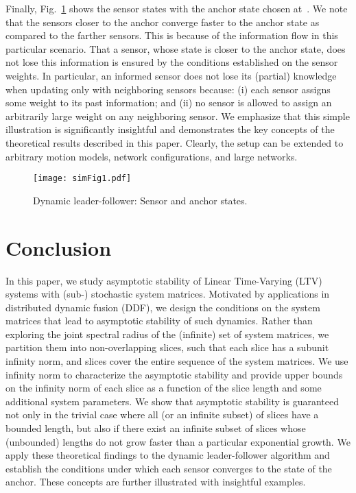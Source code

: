 \documentclass[draftclsnofoot, onecolumn, 12pt]{IEEEtran}
\begin{document}
Finally, Fig.~\ref{f4} shows the sensor states with the anchor state chosen at~. We note that the sensors closer to the anchor converge faster to the anchor state as compared to the farther sensors. This is because of the information flow in this particular scenario. That a sensor, whose state is closer to the anchor state, does not lose this information is ensured by the conditions established on the sensor weights. In particular, an informed sensor does not lose its (partial) knowledge when updating only with neighboring sensors because: (i) each sensor assigns some weight to its past information; and (ii) no sensor is allowed to assign an arbitrarily large weight on any neighboring sensor. We emphasize that this simple illustration is significantly insightful and demonstrates the key concepts of the theoretical results described in this paper. Clearly, the setup can be extended to arbitrary motion models, network configurations, and large networks. 
\begin{figure}[!h]
\centering
\texttt{[image: simFig1.pdf]}
\caption{Dynamic leader-follower: Sensor and anchor states.}
\label{f4}
\end{figure}


\section{Conclusion}\label{conc}
In this paper, we study asymptotic stability of Linear Time-Varying (LTV) systems with (sub-) stochastic system matrices. Motivated by applications in distributed dynamic fusion (DDF), we design the conditions on the system matrices that lead to asymptotic stability of such dynamics. Rather than exploring the joint spectral radius of the (infinite) set of system matrices, we partition them into non-overlapping slices, such that each slice has a subunit infinity norm, and slices cover the entire sequence of the system matrices. We use infinity norm to characterize the asymptotic stability and provide upper bounds on the infinity norm of each slice as a function of the slice length and some additional system parameters. We show that asymptotic stability is guaranteed not only in the trivial case where all (or an infinite subset) of slices have a bounded length, but also if there exist an infinite subset of slices whose (unbounded) lengths do not grow faster than a particular exponential growth. We apply these theoretical findings to the dynamic leader-follower algorithm and establish the conditions under which each sensor converges to the state of the anchor. These concepts are further illustrated with insightful examples.



\end{document}

